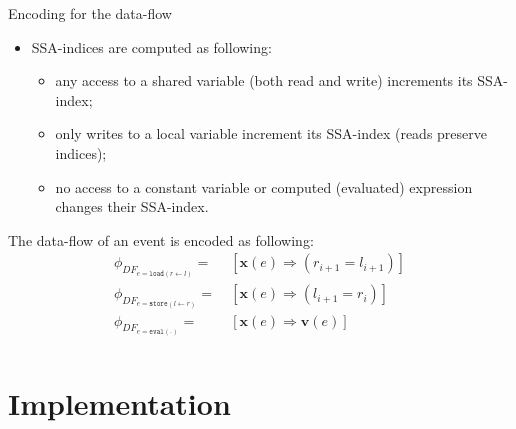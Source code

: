\documentclass{beamer}
\newcommand*{\fx}{\ensuremath{\mathbf{x}}}%
\newcommand*{\fv}{\ensuremath{\mathbf{v}}} %
\newcommand{\defeq}{\ensuremath{=}}%
\begin{document}
\begin{frame}{Encoding for the data-flow}
\begin{itemize}
\item SSA-indices are computed as following:
\begin{itemize}
  \item any access to a shared variable (both read and write) increments its SSA-index;
  \item only writes to a local variable increment its SSA-index (reads preserve indices);
  \item no access to a constant variable or computed (evaluated) expression changes their SSA-index.
\end{itemize}
\end{itemize}
The data-flow of an event is encoded as following:
\begin{align}
    \phi_{DF_{e = \texttt{load}(r \leftarrow l)}}  \defeq \ & [\fx(e) \Rightarrow (r_{i+1} = l_{i+1})] \nonumber \\
    \phi_{DF_{e = \texttt{store}(l \leftarrow r)}} \defeq \ & [\fx(e) \Rightarrow (l_{i+1} = r_i)] \nonumber\\
    \phi_{DF_{e = \texttt{eval}(\cdot)}}           \defeq \ & [\fx(e) \Rightarrow \fv(e)] \nonumber \\
\end{align}
\end{frame}




\section{Implementation}
\end{document}
